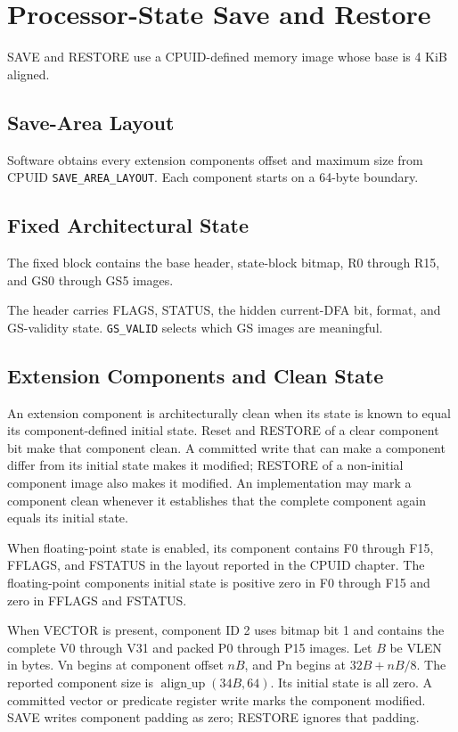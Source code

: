 \clearpage
\section{Processor-State Save and Restore}\label{page:processor-state-save-and-restore}

SAVE and RESTORE use a CPUID-defined memory image whose base is 4 KiB aligned.

\subsection{Save-Area Layout}
Software obtains every extension component\textquotesingle{}s offset and maximum size from CPUID
\texttt{SAVE\_AREA\_LAYOUT}. Each component starts on a 64-byte boundary.



\subsection{Fixed Architectural State}
The fixed block contains the base header, state-block bitmap, R0 through R15, and GS0 through GS5 images.

The header carries FLAGS, STATUS, the hidden current-DFA bit, format, and GS-validity state. \texttt{GS\_VALID}
selects which GS images are meaningful.

\subsection{Extension Components and Clean State}
An extension component is architecturally clean when its state is known to equal its component-defined initial
state. Reset and RESTORE of a clear component bit make that component clean. A committed write that can make a
component differ from its initial state makes it modified; RESTORE of a non-initial component image also makes it
modified. An implementation may mark a component clean whenever it establishes that the complete component again
equals its initial state.

When floating-point state is enabled, its component contains F0 through F15, FFLAGS, and FSTATUS in the layout
reported in the CPUID chapter. The floating-point component\textquotesingle{}s initial state is positive zero in F0 through F15 and
zero in FFLAGS and FSTATUS.

When VECTOR is present, component ID 2 uses bitmap bit 1 and contains the complete V0 through V31 and packed P0
through P15 images. Let $B$ be VLEN in bytes. Vn begins at component offset $nB$, and Pn begins at
$32B+nB/8$. The reported component size is $\operatorname{align\_up}(34B,64)$. Its initial state is all zero.
A committed vector or predicate register write marks the component modified. SAVE writes component padding as zero;
RESTORE ignores that padding.

